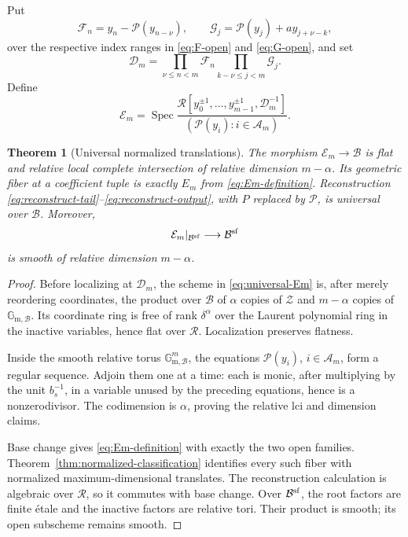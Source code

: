\documentclass[11pt]{article}
\newcommand{\Spec}{\operatorname{Spec}}
\newtheorem{theorem}[lemma]{Theorem}
\theoremstyle{remark}
\numberwithin{equation}{section}
\begin{document}
Put
\[
 \mathcal F_n=y_n-\mathcal P(y_{n-\nu}),\qquad
 \mathcal G_j=\mathcal P(y_j)+a y_{j+\nu-k},
\]
over the respective index ranges in \eqref{eq:F-open} and \eqref{eq:G-open}, and set
\[
 \mathcal D_m=
 \prod_{\nu\leq n<m}\mathcal F_n
 \prod_{k-\nu\leq j<m}\mathcal G_j.
\]
Define
\begin{equation}\label{eq:universal-Em}
 \mathcal E_m=\Spec
 \frac{\mathcal R[y_0^{\pm1},\ldots,y_{m-1}^{\pm1},
                       \mathcal D_m^{-1}]}
      {(\mathcal P(y_i):i\in\mathcal A_m)}.
\end{equation}

\begin{theorem}[Universal normalized translations]\label{thm:universal-translation}
The morphism \(\mathcal E_m\to\mathcal B\) is flat and relative local complete intersection of relative dimension \(m-\alpha\).  Its geometric fiber at a coefficient tuple is exactly \(E_m\) from \eqref{eq:Em-definition}.  Reconstruction \eqref{eq:reconstruct-tail}--\eqref{eq:reconstruct-output}, with \(P\) replaced by \(\mathcal P\), is universal over \(\mathcal B\).  Moreover,
\[
 \mathcal E_m|_{\mathcal B^{\rm sf}}\longrightarrow\mathcal B^{\rm sf}
\]
is smooth of relative dimension \(m-\alpha\).
\end{theorem}

\begin{proof}
Before localizing at \(\mathcal D_m\), the scheme in \eqref{eq:universal-Em} is, after merely reordering coordinates, the product over \(\mathcal B\) of \(\alpha\) copies of \(\mathcal Z\) and \(m-\alpha\) copies of \(\mathbb{G}_{\mathrm m,\mathcal B}\).  Its coordinate ring is free of rank \(\delta^\alpha\) over the Laurent polynomial ring in the inactive variables, hence flat over \(\mathcal R\).  Localization preserves flatness.

Inside the smooth relative torus \(\mathbb{G}_{\mathrm m,\mathcal B}^m\), the equations \(\mathcal P(y_i)\), \(i\in\mathcal A_m\), form a regular sequence.  Adjoin them one at a time: each is monic, after multiplying by the unit \(b_s^{-1}\), in a variable unused by the preceding equations, hence is a nonzerodivisor.  The codimension is \(\alpha\), proving the relative lci and dimension claims.

Base change gives \eqref{eq:Em-definition} with exactly the two open families.  Theorem~\ref{thm:normalized-classification} identifies every such fiber with normalized maximum-dimensional translates.  The reconstruction calculation is algebraic over \(\mathcal R\), so it commutes with base change.  Over \(\mathcal B^{\rm sf}\), the root factors are finite étale and the inactive factors are relative tori.  Their product is smooth; its open subscheme remains smooth.
\end{proof}
\end{document}
